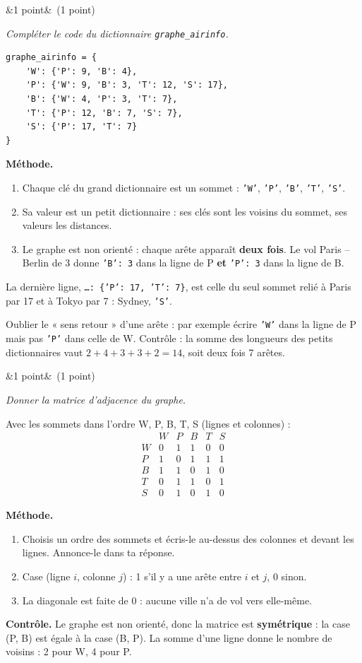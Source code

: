 \documentclass[11pt, a4paper]{exam}
\newcommand{\code}[1]{\texttt{#1}}
\newcommand{\Q}[3]{\par\needspace{5\baselineskip}\bigskip\noindent{\large\bfseries Question #1}\ifx&#2&\else\ \textnormal{(#2)}\fi\par\nopagebreak\smallskip\noindent\textit{#3}\par\nopagebreak\smallskip}
\newcommand{\methode}{\par\noindent\textbf{Méthode.}\ }
\begin{document}
\Q{8}{1 point}{Compléter le code du dictionnaire \code{graphe\_airinfo}.}
\begin{reponse}
\begin{lstlisting}
graphe_airinfo = {
    'W': {'P': 9, 'B': 4},
    'P': {'W': 9, 'B': 3, 'T': 12, 'S': 17},
    'B': {'W': 4, 'P': 3, 'T': 7},
    'T': {'P': 12, 'B': 7, 'S': 7},
    'S': {'P': 17, 'T': 7}
}
\end{lstlisting}
\end{reponse}
\methode
\begin{enumerate}
\item Chaque clé du grand dictionnaire est un sommet : \code{'W'}, \code{'P'}, \code{'B'}, \code{'T'}, \code{'S'}.
\item Sa valeur est un petit dictionnaire : ses clés sont les voisins du sommet, ses valeurs les distances.
\item Le graphe est non orienté : chaque arête apparaît \textbf{deux fois}. Le vol Paris -- Berlin de 3 donne \code{'B': 3} dans la ligne de P \textbf{et} \code{'P': 3} dans la ligne de B.
\end{enumerate}
La dernière ligne, \code{\ldots: \{'P': 17, 'T': 7\}}, est celle du seul sommet relié à Paris par 17 et à Tokyo par 7 : Sydney, \code{'S'}.
\begin{erreur}
Oublier le « sens retour » d'une arête : par exemple écrire \code{'W'} dans la ligne de P mais pas \code{'P'} dans celle de W. Contrôle : la somme des longueurs des petits dictionnaires vaut $2 + 4 + 3 + 3 + 2 = 14$, soit deux fois 7 arêtes.
\end{erreur}

\Q{9}{1 point}{Donner la matrice d'adjacence du graphe.}
\begin{reponse}
Avec les sommets dans l'ordre W, P, B, T, S (lignes et colonnes) :
\[
\begin{array}{c|ccccc}
 & W & P & B & T & S \\ \hline
W & 0 & 1 & 1 & 0 & 0 \\
P & 1 & 0 & 1 & 1 & 1 \\
B & 1 & 1 & 0 & 1 & 0 \\
T & 0 & 1 & 1 & 0 & 1 \\
S & 0 & 1 & 0 & 1 & 0
\end{array}
\]
\end{reponse}
\methode
\begin{enumerate}
\item Choisis un ordre des sommets et écris-le au-dessus des colonnes et devant les lignes. Annonce-le dans ta réponse.
\item Case (ligne $i$, colonne $j$) : 1 s'il y a une arête entre $i$ et $j$, 0 sinon.
\item La diagonale est faite de 0 : aucune ville n'a de vol vers elle-même.
\end{enumerate}
\textbf{Contrôle.} Le graphe est non orienté, donc la matrice est \textbf{symétrique} : la case (P, B) est égale à la case (B, P). La somme d'une ligne donne le nombre de voisins : 2 pour W, 4 pour P.
\end{document}
